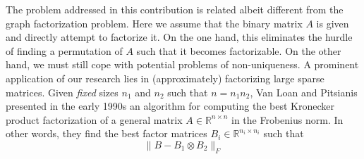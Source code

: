 \documentclass{article}
\numberwithin{equation}{section}
\theoremstyle{definition}
\begin{document}
The problem addressed in this contribution is related albeit different from the graph factorization problem. Here we assume that the binary matrix $A$ is given and directly attempt to factorize it. On the one hand, this eliminates the hurdle of finding a permutation of $A$ such that it becomes factorizable. On the other hand, we must still cope with potential problems of non-uniqueness. A prominent application of our research lies in (approximately) factorizing large sparse matrices. Given \emph{fixed} sizes $n_1$ and $n_2$ such that $n=n_1n_2$, Van Loan and Pitsianis \cite{van1993approximation} presented in the early 1990s an algorithm for computing the best Kronecker product factorization of a general matrix $A \in \mathbb{R}^{n \times n}$ in the Frobenius norm. In other words, they find the best factor matrices $B_i \in \mathbb{R}^{n_i \times n_i}$ such that
\begin{equation}
\label{eq: nkp_problem}
    \|B - B_1 \otimes B_2 \|_F
\end{equation}
\end{document}
